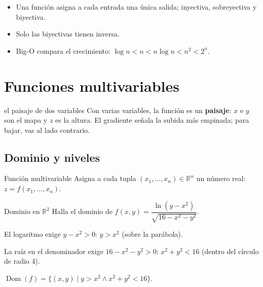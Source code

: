 
\begin{tmresumen}
\begin{itemize}
\item Una funci\'on asigna a cada entrada una \'unica salida; inyectiva, sobreyectiva y biyectiva.
\item Solo las biyectivas tienen inversa.
\item Big-O compara el crecimiento: $\log n<n<n\log n<n^2<2^n$.
\end{itemize}
\end{tmresumen}

\section{Funciones multivariables}
\label{sec:1-5}

\begin{tmconcepto}{el paisaje de dos variables}
Con varias variables, la funci\'on es un \textbf{paisaje}: $x$ e $y$ son el mapa y $z$ es la altura. El gradiente se\~nala la subida m\'as empinada; para bajar, vas al lado contrario.
\end{tmconcepto}



\subsection{Dominio y niveles}
\begin{tmdef}{Funci\'on multivariable}
Asigna a cada tupla $(x_1,\dots,x_n)\in\mathbb R^n$ un n\'umero real: $z=f(x_1,\dots,x_n)$.
\end{tmdef}

\begin{tmejemplo}{Dominio en $\mathbb R^2$}
Halla el dominio de $f(x, y)=\dfrac{\ln(y-x^2)}{\sqrt{16-x^2-y^2}}$.
\begin{tmpasos}
\item El logaritmo exige $y-x^2>0$: $y>x^2$ (sobre la par\'abola).
\item La ra\'iz en el denominador exige $16-x^2-y^2>0$: $x^2+y^2<16$ (dentro del c\'irculo de radio 4).
\item $\operatorname{Dom}(f)=\{(x, y)\mid y>x^2\wedge x^2+y^2<16\}$.
\end{tmpasos}
\end{tmejemplo}

